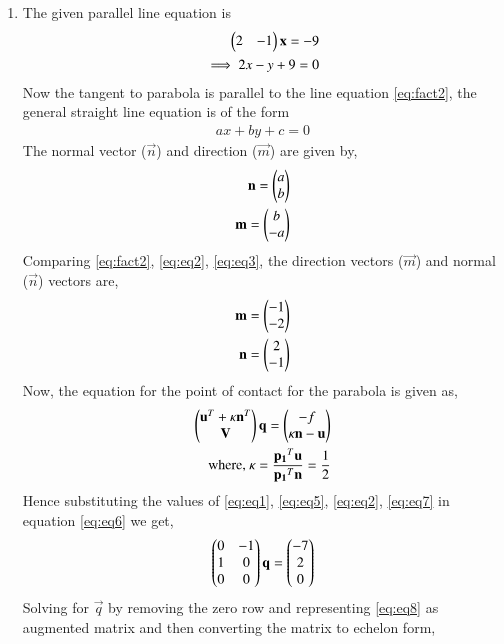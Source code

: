 \documentclass[journal,12pt,twocolumn]{IEEEtran}
\begin{document}
	\begin{enumerate}
		\item
							The given parallel line equation is
		\begin{align} 
			\begin{pmatrix}2 & -1\end{pmatrix}\mathbf{x}= -9 \\
			\implies 2x - y + 9 = 0 \label{eq:fact2}
		\end{align}
		Now the tangent to parabola is parallel to the line equation \eqref{eq:fact2}, the general straight line equation is of the form
		\begin{align}
			ax + by + c = 0
		\end{align}
		The normal vector ($\vec{n}$) and direction ($\vec{m}$) are given by,
		\begin{align} 
			\mathbf{n} = \begin{pmatrix}a\\b\end{pmatrix} \label{eq:eq3}\\
			\mathbf{m} = \begin{pmatrix}b\\-a\end{pmatrix} \label{eq:eq4}
		\end{align}
		Comparing \eqref{eq:fact2}, \eqref{eq:eq2}, \eqref{eq:eq3}, the direction vectors ($\vec{m}$) and normal ($\vec{n}$)  vectors are,
		\begin{align}
			\mathbf{m} = \begin{pmatrix}-1\\-2\end{pmatrix}\\
			\mathbf{n} = \begin{pmatrix}2\\-1\end{pmatrix}\label{eq:eq5}
		\end{align} 
		Now, the equation for the point of contact for the parabola is given as,
		\begin{align}
			\begin{pmatrix}\mathbf{u}^T+\kappa\mathbf{n}^T\\\mathbf{V}\end{pmatrix}\mathbf{q} = \begin{pmatrix}-f\\\kappa\mathbf{n}-\mathbf{u}\end{pmatrix}\label{eq:eq6}\\
			\mbox{where, } \kappa = \frac{\mathbf{p_1}^T\mathbf{u}}{\mathbf{p_1}^T\mathbf{n}} = \frac{1}{2} \label{eq:eq7}
		\end{align}
		Hence substituting the values of \eqref{eq:eq1}, \eqref{eq:eq5}, \eqref{eq:eq2}, \eqref{eq:eq7} in equation \eqref{eq:eq6} we get,
		\begin{align}
			\begin{pmatrix}0&-1\\1&0\\0&0\end{pmatrix}\mathbf{q} = \begin{pmatrix}-7\\2\\0\end{pmatrix}
			\label{eq:eq8}
		\end{align}
		Solving for $\vec{q}$ by removing the zero row and representing \eqref{eq:eq8} as augmented matrix and then converting the matrix to echelon form,
		\begin{align}

\end{align}
\end{enumerate}
\end{document}
